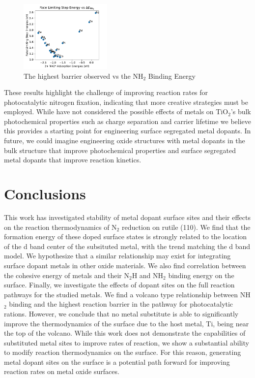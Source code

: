 \begin{figure}
    \centering
    \includegraphics[width=0.4\textwidth]{Images/NH2_v_rate_limiting.pdf}
    
    \caption{The highest barrier observed vs the NH$_2$ Binding Energy}
    \label{fig:NH2_limiting}
\end{figure}

These results highlight the challenge of improving reaction rates for photocatalytic nitrogen fixation, indicating that more creative strategies must be employed. While have not considered the possible effects of metals on TiO$_2$'s bulk photochemical properties such as charge separation and carrier lifetime we believe this provides a starting point for engineering surface segregated metal dopants. In future, we could imagine engineering oxide structures with metal dopants in the bulk structure that improve photochemical properties and surface segregated metal dopants that improve reaction kinetics.

\section{Conclusions}
This work has investigated stability of metal dopant surface sites and their effects on the reaction thermodynamics of N$_2$ reduction on rutile (110). We find that the formation energy of these doped surface states is strongly related to the location of the d band center of the subsituted metal, with the trend matching the d band model. We hypothesize that a similar relationship may exist for integrating surface dopant metals in other oxide materials. We also find correlation between the cohesive energy of metals and their N$_2$H and NH$_2$ binding energy on the surface. Finally, we investigate the effects of dopant sites on the full reaction pathways for the studied metals. We find a volcano type relationship between NH$_2$ binding and the highest reaction barrier in the pathway for photocatalytic rations. However, we conclude that no metal substitute is able to significantly improve the thermodynamics of the surface due to the host metal, Ti, being near the top of the volcano. While this work does not demonstrate the capabilities of substituted metal sites to improve rates of reaction, we show a substantial ability to modify reaction thermodynamics on the surface. For this reason, generating metal dopant sites on the surface is a potential path forward for improving reaction rates on metal oxide surfaces.


